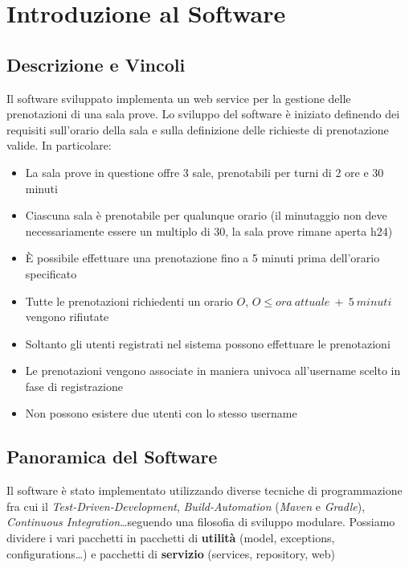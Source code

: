 \chapter{Introduzione al Software}

\section{Descrizione e Vincoli}

Il software sviluppato implementa un web service per la gestione delle prenotazioni di una sala prove.\newline
Lo sviluppo del software è iniziato definendo dei requisiti sull'orario della sala e sulla definizione delle richieste di prenotazione valide. In particolare:

\begin{itemize}
	\item La sala prove in questione offre 3 sale, prenotabili per turni di 2 ore e 30 minuti
	\item Ciascuna sala è prenotabile per qualunque orario (il minutaggio non deve necessariamente essere un multiplo di 30, la sala prove rimane aperta h24)
	\item È possibile effettuare una prenotazione fino a 5 minuti prima dell'orario specificato
	\item Tutte le prenotazioni richiedenti un orario $O$, $O \leq ora\ attuale\ +\ 5\ minuti$ vengono rifiutate
	\item Soltanto gli utenti registrati nel sistema possono effettuare le prenotazioni
	\item Le prenotazioni vengono associate in maniera univoca all'username scelto in fase di registrazione
	\item Non possono esistere due utenti con lo stesso username
\end{itemize}

\section{Panoramica del Software}

Il software è stato implementato utilizzando diverse tecniche di programmazione fra cui il \textsl{Test-Driven-Development}, \textsl{Build-Automation} (\textsl{Maven} e \textsl{Gradle}), \textsl{Continuous Integration}\dots seguendo una filosofia di sviluppo modulare. Possiamo dividere i vari pacchetti in pacchetti di \textbf{utilità} (model, exceptions, configurations\dots) e pacchetti di \textbf{servizio} (services, repository, web)

